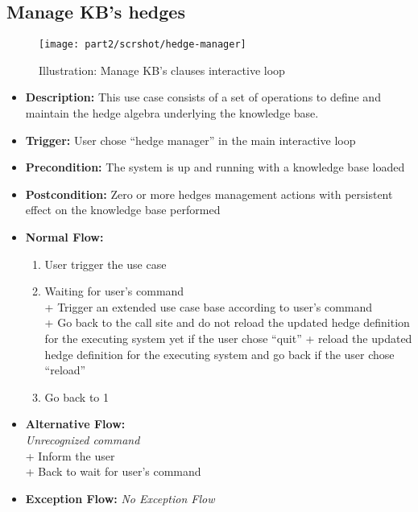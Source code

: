 \documentclass[../gr-final.tex]{subfiles}
\begin{document}
\subsection{Manage KB's hedges}
\begin{figure}[H]
  \centering
  \texttt{[image: part2/scrshot/hedge-manager]}
  \caption{Illustration: Manage KB's clauses interactive loop}
\end{figure}
\begin{itemize}
  \item {\bfseries Description:} This use case consists of a set
    of operations to define and maintain the hedge algebra
    underlying the knowledge base.
  \item {\bfseries Trigger:} User chose ``hedge manager'' in the
    main interactive loop
  \item {\bfseries Precondition:} The system is up and running
    with a knowledge base loaded    
  \item {\bfseries Postcondition:} Zero or more hedges management
    actions with persistent effect on the knowledge base performed
  \item {\bfseries Normal Flow:}
    \begin{enumerate}
      \item User trigger the use case
      \item Waiting for user's command\\
      \indent + Trigger an extended use case base according to
      user's command\\
      \indent + Go back to the call site and do not reload the
      updated hedge definition for the executing system yet if
      the user chose ``quit''
      \indent + reload the updated hedge definition for the executing system and 
      go back if the user chose ``reload''
      
      \item Go back to 1
    \end{enumerate}
  \item {\bfseries Alternative Flow:}\\
    {\em Unrecognized command}\\
    \indent + Inform the user\\
    \indent + Back to wait for user's command
  \item {\bfseries Exception Flow:} {\em No Exception Flow}
\end{itemize}
\end{document}
